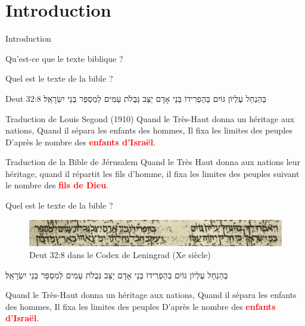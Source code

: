 \documentclass[11pt]{beamer}
\begin{document}
\subtitle{Session 1 : Bible hébraïque}


\begin{frame}
	\titlepage
\end{frame}

\section{Introduction}

\begin{frame}{Introduction}
\begin{block}{}
\centering Qu'est-ce que le texte biblique ?
\end{block}
\end{frame}

\begin{frame}{Quel est le texte de la bible ?}
\begin{block}{Deut 32:8}
\RTL\noindent
\texthebrew{בְּהַנְחֵל עֶלְיוֹן גּוֹיִם בְּהַפְרִידוֹ בְּנֵי אָדָם יַצֵּב גְּבֻלֹת עַמִּים לְמִסְפַּר בְּנֵי יִשְׂרָאֵֽל׃}
\end{block}

\pause

\begin{exampleblock}{Traduction de Louis Segond (1910)}
Quand le Très-Haut donna un héritage aux nations, Quand il sépara les enfants des hommes, Il fixa les limites des peuples D'après le nombre des \textbf{\textcolor{red}{enfants d'Israël}}.  
\end{exampleblock}

\pause

\begin{alertblock}{Traduction de la Bible de Jérusalem}
Quand le Très Haut donna aux nations leur héritage, quand il répartit les fils d'homme, il fixa les limites des peuples suivant le nombre des \textbf{\textcolor{red}{fils de Dieu}}.
\end{alertblock}
    
\end{frame}

\begin{frame}{Quel est le texte de la bible ?}
    \begin{figure}
        \centering
        \includegraphics[width=1\linewidth]{img/leningrad_deut_32_8.png}
        \caption{Deut 32:8 dans le Codex de Leningrad (Xe siècle)}
    \end{figure}
    \begin{block}{\RTL \texthebrew{בְּהַנְחֵל עֶלְיוֹן גּוֹיִם בְּהַפְרִידוֹ בְּנֵי אָדָם יַצֵּב גְּבֻלֹת עַמִּים לְמִסְפַּר בְּנֵי יִשְׂרָאֵֽל׃}}
       
        Quand le Très-Haut donna un héritage aux nations, Quand il sépara les enfants des hommes, Il fixa les limites des peuples D'après le nombre des \textbf{\textcolor{red}{enfants d'Israël}}.
    \end{block}
\end{frame}
\end{document}
